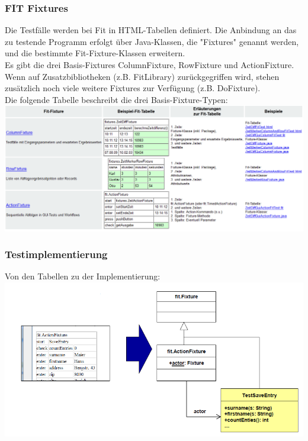 \documentclass[a4paper,10pt]{article}
\begin{document}
\subsubsection{FIT Fixtures}
Die Testfälle werden bei Fit in HTML-Tabellen definiert. Die Anbindung an das zu testende Programm erfolgt über Java-Klassen, die "Fixtures" genannt werden, und die bestimmte Fit-Fixture-Klassen erweitern.\\
Es gibt die drei Basis-Fixtures ColumnFixture, RowFixture und ActionFixture. Wenn auf Zusatzbibliotheken (z.B. FitLibrary) zurückgegriffen wird, stehen zusätzlich noch viele weitere Fixtures zur Verfügung (z.B. DoFixture).\\
Die folgende Tabelle beschreibt die drei Basis-Fixture-Typen:\\
\includegraphics[scale=0.55]{FIT_Fixtures.png}

\subsubsection{Testimplementierung}
Von den Tabellen zu der Implementierung:\\
\includegraphics[scale=0.6]{FIT_TestImplementierung.png}
\end{document}
